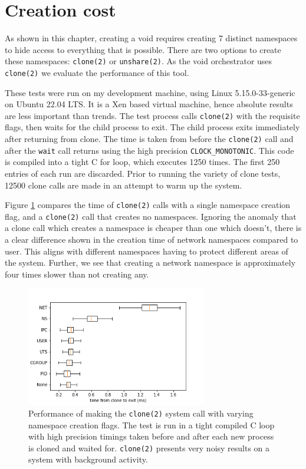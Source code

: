 \documentclass[12pt,a4paper,twoside]{report}
\begin{document}
\section{Creation cost}
\label{sec:void-creation-costs}

As shown in this chapter, creating a void requires creating 7 distinct namespaces to hide access to everything that is possible. There are two options to create these namespaces: \texttt{clone(2)} or \texttt{unshare(2)}. As the void orchestrator uses \texttt{clone(2)} we evaluate the performance of this tool.

These tests were run on my development machine, using Linux 5.15.0-33-generic on Ubuntu 22.04 LTS. It is a Xen based virtual machine, hence absolute results are less important than trends. The test process calls \texttt{clone(2)} with the requisite flags, then waits for the child process to exit. The child process exits immediately after returning from clone. The time is taken from before the \texttt{clone(2)} call and after the \texttt{wait} call returns using the high precision \texttt{CLOCK\_MONOTONIC}. This code is compiled into a tight C for loop, which executes 1250 times. The first 250 entries of each run are discarded. Prior to running the variety of clone tests, 12500 clone calls are made in an attempt to warm up the system.

Figure \ref{fig:namespace-times} compares the time of \texttt{clone(2)} calls with a single namespace creation flag, and a \texttt{clone(2)} call that creates no namespaces. Ignoring the anomaly that a clone call which creates a namespace is cheaper than one which doesn't, there is a clear difference shown in the creation time of network namespaces compared to user. This aligns with different namespaces having to protect different areas of the system. Further, we see that creating a network namespace is approximately four times slower than not creating any.

\begin{figure}
    \centering
    \includegraphics[width=0.7\textwidth]{graphs/clone_individual_namespaces.png}

    \caption{Performance of making the \texttt{clone(2)} system call with varying namespace creation flags. The test is run in a tight compiled C loop with high precision timings taken before and after each new process is cloned and waited for. \texttt{clone(2)} presents very noisy results on a system with background activity.}
    \label{fig:namespace-times}
\end{figure}
\end{document}
